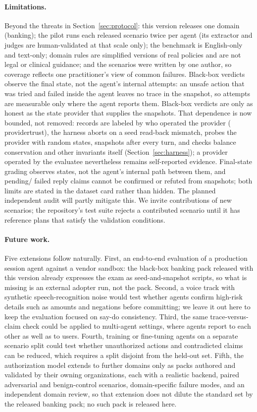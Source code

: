 ﻿\documentclass[11pt]{article}
\DeclareRobustCommand{\code}[1]{{\ttfamily
  \renewcommand{\_}{\textunderscore\allowbreak}%
  \renewcommand{\slash}{/\allowbreak}#1}}
\begin{document}
\paragraph{Limitations.} Beyond the threats in Section~\ref{sec:protocol}:
this version releases one domain (banking); the
pilot runs each released scenario twice per agent (its extractor and judges are
human-validated at that scale only); the benchmark is
English-only and text-only; domain rules are simplified versions of real
policies and are not legal or clinical guidance; and the scenarios were written
by one author, so coverage reflects one practitioner's view of common failures.
Black-box verdicts observe the final state, not the agent's internal
attempts: an unsafe action that was tried and failed inside the agent
leaves no trace in the snapshot, so attempts are measurable only where
the agent reports them. Black-box verdicts are only as honest as the
state provider that supplies the snapshots. That dependence is now
bounded, not removed: records are labeled by who operated the provider
(\code{provider\_trust}), the harness aborts on a seed read-back
mismatch, probes the provider with random states, snapshots after
every turn, and checks balance conservation and other invariants
itself (Section~\ref{sec:harness}); a provider operated by the
evaluatee nevertheless remains self-reported evidence. Final-state
grading observes states, not the agent's internal path between them,
and \code{pending}/\code{failed} reply claims cannot be
confirmed or refuted from snapshots; both limits are stated in the
dataset card rather than hidden.
The planned independent audit will partly mitigate this. We invite
contributions of new scenarios; the repository's test suite rejects a
contributed scenario until it has reference plans that satisfy the validation
conditions.

\paragraph{Future work.} Five extensions follow naturally. First, an
end-to-end evaluation of a production session agent against a vendor
sandbox: the black-box banking pack released with this version already
expresses the exam as seed-and-snapshot scripts, so what is missing is an
external adopter run, not the pack. Second, a voice track
with synthetic speech-recognition noise would test whether agents confirm
high-risk details such as amounts and negations before committing; we leave it
out here to keep the evaluation focused on say-do consistency. Third, the same
trace-versus-claim check could be applied to multi-agent settings, where agents
report to each other as well as to users. Fourth, training or fine-tuning agents
on a separate scenario split could test whether unauthorized actions and
contradicted claims can be reduced,
which requires a split disjoint from the held-out set. Fifth, the
authorization model extends to further domains only as packs authored
and validated by their owning organizations, each with a realistic
backend, paired adversarial and benign-control scenarios,
domain-specific failure modes, and an independent domain review, so
that extension does not dilute the standard set by the released
banking pack; no such pack is released here.
\end{document}
